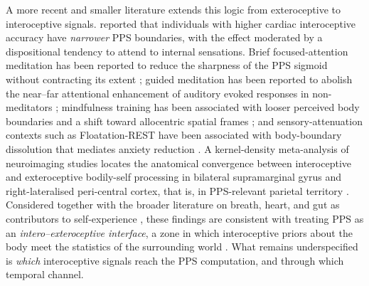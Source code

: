 
A more recent and smaller literature extends this logic from exteroceptive to interoceptive signals. \citet{Ardizzi2018} reported that individuals with higher cardiac interoceptive accuracy have \emph{narrower} PPS boundaries, with the effect moderated by a dispositional tendency to attend to internal sensations. Brief focused-attention meditation has been reported to reduce the sharpness of the PPS sigmoid without contracting its extent \citep{Chiarella2024}; guided meditation has been reported to abolish the near--far attentional enhancement of auditory evoked responses in non-meditators \citep{nguyen_2020}; mindfulness training has been associated with looser perceived body boundaries and a shift toward allocentric spatial frames \citep{hanley_2020}; and sensory-attenuation contexts such as Floatation-REST have been associated with body-boundary dissolution that mediates anxiety reduction \citep{hruby_2024}. A kernel-density meta-analysis of neuroimaging studies locates the anatomical convergence between interoceptive and exteroceptive bodily-self processing in bilateral supramarginal gyrus and right-lateralised peri-central cortex, that is, in PPS-relevant parietal territory \citep{salvato_2020}. Considered together with the broader literature on breath, heart, and gut as contributors to self-experience \citep{seth2013interoceptive, barrett2016theory, Park2019, bogdanova_2021}, these findings are consistent with treating PPS as an \emph{intero--exteroceptive interface}, a zone in which interoceptive priors about the body meet the statistics of the surrounding world \citep{salvato_2020, bogdanova_2021, noel_2021}. What remains underspecified is \emph{which} interoceptive signals reach the PPS computation, and through which temporal channel.

